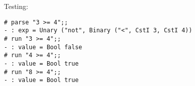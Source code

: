 \documentclass[addpoints]{exam}
\begin{document}
\begin{questions}
\begin{solution}
    Testing:
    \begin{verbatim}
# parse "3 >= 4";;
- : exp = Unary ("not", Binary ("<", CstI 3, CstI 4))
# run "3 >= 4";;  
- : value = Bool false
# run "4 >= 4";;
- : value = Bool true
# run "8 >= 4";;
- : value = Bool true
    \end{verbatim}
  \end{solution}

  
\end{questions}
\end{document}
